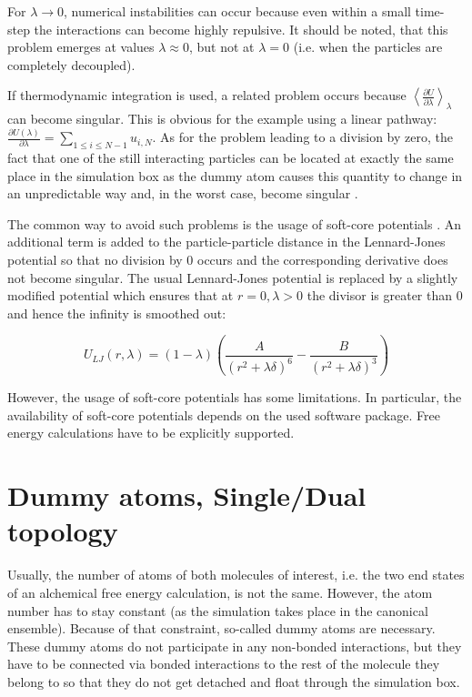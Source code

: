 For $\lambda\rightarrow0$, numerical instabilities can occur because
even within a small time-step the interactions can become highly repulsive.
It should be noted, that this problem emerges at values $\lambda\approx0$,
but not at $\lambda=0$ (i.e. when the particles are completely decoupled).

If thermodynamic integration is used, a related problem occurs because
$\left\langle \frac{\partial U}{\partial\lambda}\right\rangle _{\lambda}$can
become singular. This is obvious for the example using a linear pathway:
$\frac{\partial U\left(\lambda\right)}{\partial\lambda}=\sum_{1\leq i\leq N-1}u_{i,N}$.
As for the problem leading to a division by zero, the fact that one of the
still interacting particles can be located at exactly the same place
in the simulation box as the dummy atom causes this quantity to change
in an unpredictable way and, in the worst case, become singular \cite{Boresch.2011}.

The common way to avoid such problems is the usage of soft-core potentials \cite{Steinbrecher.2011}.
An additional term is added to the particle-particle distance in the Lennard-Jones potential so that
no division by 0 occurs and the corresponding derivative does not
become singular. The usual Lennard-Jones potential is replaced by
a slightly modified potential which ensures that at $r=0,\lambda>\text{0}$
the divisor is greater than 0 and hence the infinity is smoothed out:

\[
U_{LJ}\left(r,\lambda\right)=\left(1-\lambda\right)\left(\frac{A}{\left(r^{2}+\lambda\delta\right)^{6}}-\frac{B}{\left(r^{2}+\lambda\delta\right)^{3}}\right)
\]

However, the usage of soft-core potentials has some limitations. In
particular, the availability of soft-core potentials depends on the
used software package. Free energy calculations have to be explicitly
supported. 

\section{Dummy atoms, Single/Dual topology}

Usually, the number of atoms of both molecules of interest, i.e. the
two end states of an alchemical free energy calculation, is not
the same. However, the atom number has to stay constant (as the simulation
takes place in the canonical ensemble). Because of that constraint,
so-called dummy atoms are necessary. \cite{Fleck.2021} These dummy
atoms do not participate in any non-bonded interactions, but they
have to be connected via bonded interactions to the rest of the molecule
they belong to so that they do not get detached and float through
the simulation box.

